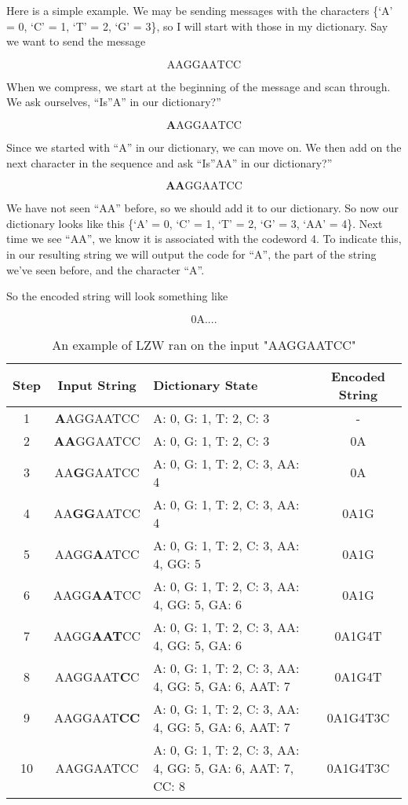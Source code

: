 \documentclass[12pt,twoside]{reedthesis}
\begin{document}
Here is a simple example. We may be sending messages with the characters \{`A' = 0, `C' = 1, `T' = 2, `G' = 3\}, so I will start with those in my dictionary. Say we want to send the message

\[\text{AAGGAATCC}\]

When we compress, we start at the beginning of the message and scan through. We ask ourselves, ``Is''A'' in our dictionary?''

\[\textbf{A} \text{AGGAATCC}\]

Since we started with ``A'' in our dictionary, we can move on. We then add on the next character in the sequence and ask ``Is''AA'' in our dictionary?''

\[\textbf{AA} \text{GGAATCC}\]

We have not seen ``AA'' before, so we should add it to our dictionary. So now our dictionary looks like this \{`A' = 0, `C' = 1, `T' = 2, `G' = 3, `AA' = 4\}. Next time we see ``AA'', we know it is associated with the codeword 4. To indicate this, in our resulting string we will output the code for ``A'', the part of the string we've seen before, and the character ``A''.

So the encoded string will look something like

\[\text{0A....}\]
\begin{table}
\begin{tabular}{ | c | c | p{} | c | }
\hline
\textbf{Step} & \textbf{Input String} & \textbf{Dictionary State} & \textbf{Encoded String} \\
\hline
1 & \textbf{A}AGGAATCC & {A: 0, G: 1, T: 2, C: 3} & - \\
\hline
2 & \textbf{AA}GGAATCC & {A: 0, G: 1, T: 2, C: 3} & 0A \\
\hline
3 & AA\textbf{G}GAATCC & {A: 0, G: 1, T: 2, C: 3, AA: 4} & 0A  \\
\hline
4 & AA\textbf{GG}AATCC & {A: 0, G: 1, T: 2, C: 3, AA: 4} & 0A1G   \\
\hline
5 & AAGG\textbf{A}ATCC & {A: 0, G: 1, T: 2, C: 3, AA: 4, GG: 5} & 0A1G \\
\hline
6 & AAGG\textbf{AA}TCC & {A: 0, G: 1, T: 2, C: 3, AA: 4, GG: 5, GA: 6} & 0A1G  \\
\hline
7 & AAGG\textbf{AAT}CC & {A: 0, G: 1, T: 2, C: 3, AA: 4, GG: 5, GA: 6} & 0A1G4T  \\
\hline
8 & AAGGAAT\textbf{C}C & {A: 0, G: 1, T: 2, C: 3, AA: 4, GG: 5, GA: 6, AAT: 7} & 0A1G4T \\
\hline
9 & AAGGAAT\textbf{CC} & {A: 0, G: 1, T: 2, C: 3, AA: 4, GG: 5, GA: 6, AAT: 7} & 0A1G4T3C \\
\hline
10 & AAGGAATCC & {A: 0, G: 1, T: 2, C: 3, AA: 4, GG: 5, GA: 6, AAT: 7, CC: 8} & 0A1G4T3C \\
\hline
\end{tabular}
\caption{ An example of LZW ran on the input "AAGGAATCC"}
\end{table}
\newpage
\end{document}
